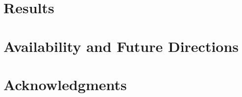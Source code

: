 \documentclass[aps,pre,twocolumn,nofootinbib,superscriptaddress,linenumbers]{revtex4-1}
\begin{document}





\label{section:design}

\section{Results}
\label{section:results}

\section{Availability and Future Directions}
\label{section:availability}

\section{Acknowledgments}
\label{section:acknowledgments}


% 

\end{document}
